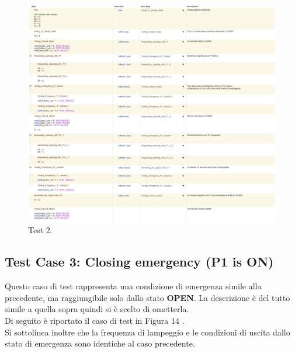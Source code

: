 \documentclass[12pt]{article}
\begin{document}
\begin{figure}[H]
    
    \hspace{-2.3cm} %
    \includegraphics[width=1.3\textwidth]{Immagini_Test/Test_2_img.PNG}
    \caption{Test 2.}
    \label{fig:Test_2}
\end{figure}

\subsection{Test Case 3: Closing emergency (P1 is ON)}

Questo caso di test rappresenta una condizione di emergenza simile alla precedente, ma raggiungibile solo dallo stato \textbf{OPEN}. La descrizione è del tutto simile a quella sopra quindi si è scelto di ometterla. \\
Di seguito è riportato il caso di test in Figura 14 .\\
Si sottolinea inoltre che la frequenza di lampeggio e le condizioni di uscita dallo stato di emergenza sono identiche al caso precedente.
\end{document}
